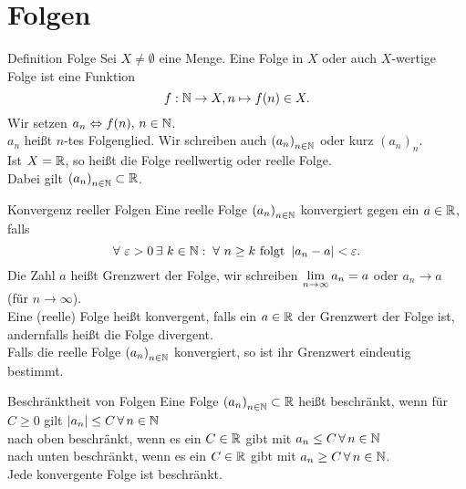\documentclass[main.tex]{subfiles}
\begin{document}
\section*{Folgen}

\begin{karte}{Definition Folge}
    Sei \( X \neq \emptyset \) eine Menge. Eine Folge in 
    \(X \) oder auch \(X \)-wertige Folge ist eine Funktion 
	\[ f : \mathbb{N} \rightarrow X, n \mapsto f(n) \in X. \]
	Wir setzen \(a_n \Leftrightarrow f(n), \, n \in \mathbb{N} \).\\
    \(a_n \) heißt \(n \)-tes Folgenglied. 
    Wir schreiben auch 
    \( {(a_n)}_{n \in \mathbb{N}} \) oder kurz \( {(a_n)}_n \).\\
    Ist \( X = \mathbb{R} \), so heißt die Folge reellwertig oder 
    reelle Folge. \\
	Dabei gilt \( {(a_n)}_{n\in\mathbb{N}} \subset \mathbb{R} \).
\end{karte}
\begin{karte}{Konvergenz reeller Folgen}
    Eine reelle Folge \( {(a_n)}_{n \in \mathbb{N}} \) konvergiert 
    gegen ein \(a \in \mathbb{R} \), falls \[ \forall \, 
    \varepsilon > 0 \, \exists \, k \in \N : \; 
    \forall \, n \geq k \text{ folgt } \abs{a_n - a} 
    < \varepsilon. \]
    Die Zahl \(a\) heißt Grenzwert der Folge, 
    wir schreiben \( \lim\limits_{n\rightarrow\infty} a_n = a \) oder 
    \( a_n\rightarrow a \) (für \( n\rightarrow\infty \)).\\
    Eine (reelle) Folge heißt konvergent, 
    falls ein \( a\in\mathbb{R} \) der Grenzwert 
    der Folge ist, andernfalls heißt die Folge divergent.\\
    
    Falls die reelle Folge \({(a_n)}_{n\in\mathbb{N}}\) konvergiert, 
    so ist ihr Grenzwert eindeutig bestimmt.
\end{karte}
\begin{karte}{Beschränktheit von Folgen}
    Eine Folge \( {(a_n)}_{n\in\mathbb{N}} \subset \mathbb{R} \) heißt 
    beschränkt, wenn für \\
    \( C\geq 0 \) gilt \( \abs{a_n} \leq C \, \forall n\in\N \) \\
    nach oben beschränkt, wenn es ein \(C\in\mathbb{R} \) gibt mit 
    \( a_n\leq C \, \forall n\in\N \) \\
    nach unten beschränkt, wenn es ein \(C\in\mathbb{R} \) gibt mit 
    \( a_n\geq C \, \forall n\in\N \).\\
    
    Jede konvergente Folge ist beschränkt.
\end{karte}
\end{document}
